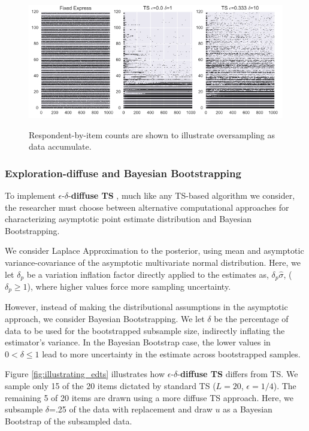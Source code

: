 \documentclass[nonblindrev]{informs3}
\newcommand{\edts}{$\epsilon$-$\delta$-\textbf{diffuse TS} }
\newcommand{\numperset}{L}
\begin{document}
\begin{figure}[!ht]
\caption{Respondent-by-item counts are shown to illustrate oversampling as data accumulate.}
\includegraphics[width=1\textwidth]{plots/3dotplot-lowres.png}
\label{fig:dots}
\end{figure}


\subsubsection{Exploration-diffuse and Bayesian Bootstrapping}

To implement \edts, much like any TS-based algorithm we consider, the researcher must choose between alternative computational approaches for characterizing asymptotic point estimate distribution and Bayesian Bootstrapping. 

We consider Laplace Approximation to the posterior, using mean and asymptotic variance-covariance of the asymptotic multivariate normal distribution. Here, we let $\delta_p$ be a variation inflation factor directly applied to the estimates as, $\delta_p  \hat \sigma$, ($\delta_p \geq 1$), where higher values force more sampling uncertainty.

However, instead of making the distributional assumptions in the asymptotic approach, we consider Bayesian Bootstrapping. We let $\delta$ be the percentage of data to be used for the bootstrapped subsample size, indirectly inflating the estimator's variance. In the Bayesian Bootstrap case, the lower values in $0 < \delta \leq 1$ lead to more uncertainty in the estimate across bootstrapped samples.

Figure \ref{fig:illustrating_edts} illustrates how \edts differs from TS. We sample only 15 of the 20 items dictated by standard TS ($\numperset=20$, $\epsilon=1/4$). The remaining 5 of 20 items are drawn using a more diffuse TS approach. Here, we subsample $\delta$=.25 of the data with replacement and draw $u$ as a Bayesian Bootstrap of the subsampled data. 
\end{document}
